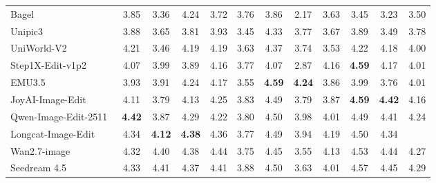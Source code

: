 \documentclass{llmxive}
\begin{document}
\begin{table}[t]
{\begin{tabular}{l|cccccccccc|c}
            Bagel~\cite{deng2025emerging}
            & 3.85 & 3.36 & 4.24 & 3.72 & 3.76 & 3.86 & 2.17 & 3.63 & 3.45 & 3.23
            & \cellcolor[HTML]{C8C8C8}3.50 \\

            

            Unipic3~\cite{wei2026skywork}
            & 3.88 & 3.65 & 3.81 & 3.93 & 3.45 & 4.33 & 3.77 & 3.67 & 3.89 & 3.49
            & \cellcolor[HTML]{C8C8C8}3.78 \\

            UniWorld-V2~\cite{li2025uniworld}
            & 4.21 & 3.46 & 4.19 & 4.19 & 3.63 & 4.37 & 3.74 & 3.53 & 4.22 & 4.18
            & \cellcolor[HTML]{C8C8C8}4.00 \\


            Step1X-Edit-v1p2~\cite{liu2025step1x}
            & 4.07 & 3.99 & 3.89 & 4.16 & 3.77 & 4.07 & 2.87 & 4.16 & \textbf{4.59} & 4.17
            & \cellcolor[HTML]{C8C8C8}4.01 \\
            
            EMU3.5~\cite{cui2025emu3}
            & 3.93 & 3.91 & 4.24 & 4.17 & 3.55 &  \textbf{4.59} & \textbf{4.24} & 3.86 & 3.99 & 3.76
            & \cellcolor[HTML]{C8C8C8}4.01 \\

            


            JoyAI-Image-Edit~\cite{joyaiimage2026}
            & 4.11 & 3.79 & 4.13 & 4.25 & 3.83 & 4.49 & 3.79 & 3.87 & \textbf{4.59} & \textbf{4.42}
            & \cellcolor[HTML]{C8C8C8}4.16 \\

            Qwen-Image-Edit-2511~\cite{wu2025qwen}
            & \textbf{4.42} & 3.87 & 4.29 & 4.22 & 3.80 & 4.50 & 3.98 & 4.01 & 4.49 & 4.41
            & \cellcolor[HTML]{C8C8C8}4.24 \\

            Longcat-Image-Edit~\cite{team2025longcat}
            & 4.34 & \textbf{4.12} & \textbf{4.38} & 4.36 & 3.77 & 4.49 & 3.94 & 4.19 & 4.50 & 4.34
            & \cellcolor[HTML]{C8C8C8}{\textbf{4.26}} \\
            \midrule

            

            Wan2.7-image~\cite{nanobananapro}
            & 4.32 & 4.40 & 4.38 & 4.44 & 3.75 & 4.45 & 3.55 & 4.13 & 4.53 & 4.44
            & \cellcolor[HTML]{C8C8C8} 4.27  \\

            Seedream 4.5~\cite{seedream2025seedream}
            & 4.33 & 4.41 & 4.37 & 4.41 & 3.88 & 4.50 & 3.63 & 4.01 & 4.57 & 4.45
            & \cellcolor[HTML]{C8C8C8}4.29 \\


\end{tabular}}
\end{table}
\end{document}

